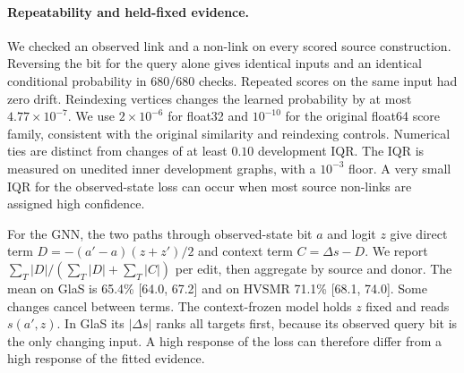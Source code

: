 \paragraph{Repeatability and held-fixed evidence.}
We checked an observed link and a non-link on every scored source construction. Reversing the bit for the query alone gives identical inputs and an identical conditional probability in 680/680 checks. Repeated scores on the same input had zero drift. Reindexing vertices changes the learned probability by at most $4.77\times10^{-7}$. We use $2\times10^{-6}$ for float32 and $10^{-10}$ for the original float64 score family, consistent with the original similarity and reindexing controls. Numerical ties are distinct from changes of at least $0.10$ development IQR. The IQR is measured on unedited inner development graphs, with a $10^{-3}$ floor. A very small IQR for the observed-state loss can occur when most source non-links are assigned high confidence.

For the GNN, the two paths through observed-state bit $a$ and logit $z$ give direct term $D=-(a'-a)(z+z')/2$ and context term $C=\Delta s-D$. We report $\sum_T|D|/(\sum_T|D|+\sum_T|C|)$ per edit, then aggregate by source and donor. The mean on GlaS is 65.4\% [64.0, 67.2] and on HVSMR 71.1\% [68.1, 74.0]. Some changes cancel between terms. The context-frozen model holds $z$ fixed and reads $s(a',z)$. In GlaS its $|\Delta s|$ ranks all targets first, because its observed query bit is the only changing input. A high response of the loss can therefore differ from a high response of the fitted evidence.

\begin{table}[t]
\centering
\caption{\textbf{Matched switch sensitivity, direction, and collateral.} $T$ denotes the four targets and $U$ untouched pairs. AUROCs, moved fractions and directional wins are percentages. $W_+$ and $W_-$ summarize additions and removals. The last five columns use development IQR units and report signed mean target shift and absolute shift percentiles. Each percentile is first taken within an edit. The matched scope has 78 fields from 12 gland donors and 59 scans from 59 cardiac donors. Full paired intervals and raw pair scores are retained in the reproducibility data.}
\label{tab:shifts}
\scriptsize
\setlength{\tabcolsep}{2.8pt}

\end{table}

